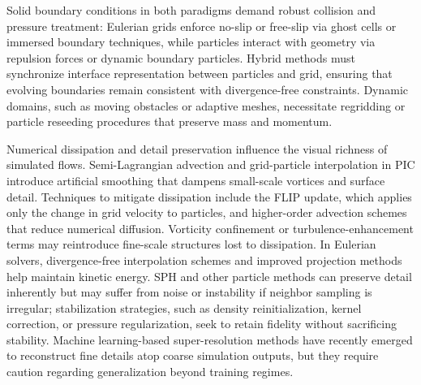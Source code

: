 Solid boundary conditions in both paradigms demand robust collision and pressure treatment: Eulerian grids enforce no-slip or free-slip via ghost cells or immersed boundary techniques, while particles interact with geometry via repulsion forces or dynamic boundary particles. Hybrid methods must synchronize interface representation between particles and grid, ensuring that evolving boundaries remain consistent with divergence-free constraints. Dynamic domains, such as moving obstacles or adaptive meshes, necessitate regridding or particle reseeding procedures that preserve mass and momentum.


Numerical dissipation and detail preservation influence the visual richness of simulated flows. Semi-Lagrangian advection and grid-particle interpolation in PIC introduce artificial smoothing that dampens small-scale vortices and surface detail. Techniques to mitigate dissipation include the FLIP update, which applies only the change in grid velocity to particles, and higher-order advection schemes that reduce numerical diffusion. Vorticity confinement or turbulence-enhancement terms may reintroduce fine-scale structures lost to dissipation. In Eulerian solvers, divergence-free interpolation schemes and improved projection methods help maintain kinetic energy. SPH and other particle methods can preserve detail inherently but may suffer from noise or instability if neighbor sampling is irregular; stabilization strategies, such as density reinitialization, kernel correction, or pressure regularization, seek to retain fidelity without sacrificing stability. Machine learning-based super-resolution methods have recently emerged to reconstruct fine details atop coarse simulation outputs, but they require caution regarding generalization beyond training regimes.


